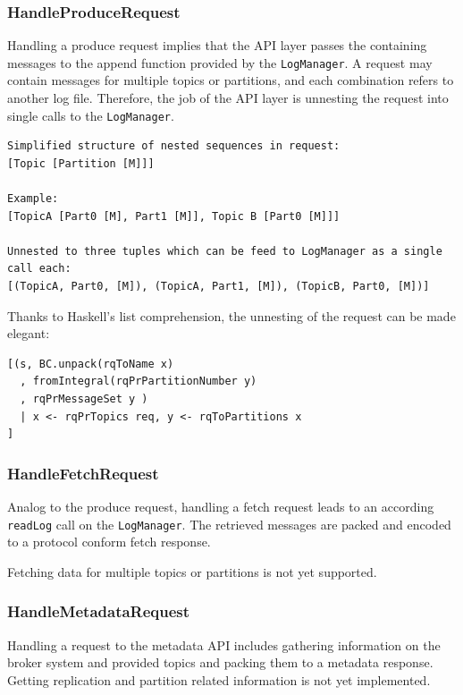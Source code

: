 \newpage
\subsubsection{HandleProduceRequest}
\label{subsec:broker-api-producerequest}
Handling a produce request implies that the API layer passes the containing
messages to the append function provided by the \lstinline{LogManager}. A
request may contain messages for multiple topics or partitions, and each
combination refers to another log file. Therefore, the job of the API layer is unnesting
the request into single calls to the \lstinline{LogManager}.
\begin{verbatim}
Simplified structure of nested sequences in request:
[Topic [Partition [M]]]

Example:
[TopicA [Part0 [M], Part1 [M]], Topic B [Part0 [M]]]

Unnested to three tuples which can be feed to LogManager as a single call each:
[(TopicA, Part0, [M]), (TopicA, Part1, [M]), (TopicB, Part0, [M])]

\end{verbatim}

Thanks to Haskell's list comprehension, the unnesting of the request can be made
elegant: \begin{lstlisting}[caption={Handling produce request}]
[(s, BC.unpack(rqToName x)
  , fromIntegral(rqPrPartitionNumber y)
  , rqPrMessageSet y ) 
  | x <- rqPrTopics req, y <- rqToPartitions x
]
\end{lstlisting}

\subsubsection{HandleFetchRequest}
\label{subsec:broker-api-fetchrequest}
Analog to the produce request, handling a fetch request leads to an according
\lstinline{readLog} call on the \lstinline{LogManager}. The retrieved messages
are packed and encoded to a protocol conform fetch response.

Fetching data for multiple topics or partitions is not yet supported.

\subsubsection{HandleMetadataRequest}
Handling a request to the metadata API includes gathering information on the
broker system and provided topics and packing them to a metadata response. Getting
replication and partition related information is not yet implemented.

